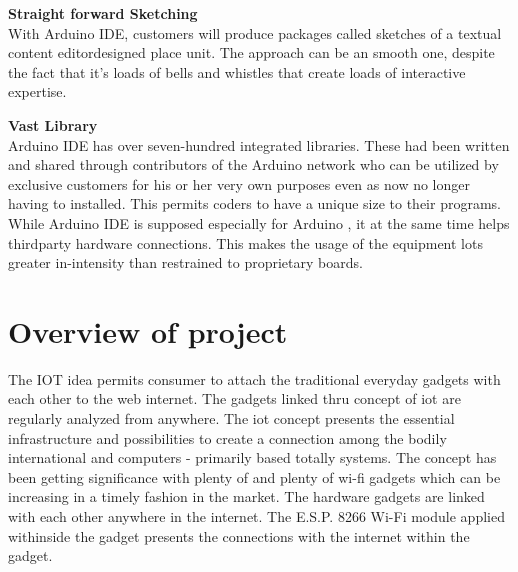 \documentclass[12pt,a4paper]{article}
\begin{document}
\vspace{0.1in}
\textbf{\large{Straight forward Sketching }}\\

\hspace{0.5cm}With Arduino IDE, customers will produce packages called sketches of a textual content editordesigned place unit. The approach can be an smooth one, despite the fact that it’s loads of bells and whistles
that create loads of interactive expertise.

\vspace{0.1in}
\textbf{\large{Vast Library }}\\

\hspace{0.5cm}Arduino IDE has over seven-hundred integrated libraries. These had been written and shared through
contributors of the Arduino network who can be utilized by exclusive customers for his or her very own purposes
even as now no longer having to installed. This permits coders to have a unique size to
their programs. While Arduino IDE is supposed especially for Arduino , it at the same time helps thirdparty hardware connections. This makes the usage of the equipment lots greater in-intensity than
restrained to proprietary boards.



\newpage
\pagebreak
\vspace*{\fill}%
\noindent
{}
\vfill


\newpage
\section{Overview of project}
\fancyfoot[R]{\thepage}

\hspace{0.5cm}The IOT idea permits consumer to attach the traditional everyday gadgets with each other to the web internet. The gadgets linked thru concept of iot are regularly analyzed from anywhere. The iot concept presents the essential infrastructure and possibilities to create a connection among the bodily international and computers - primarily based totally systems. The concept has been getting significance with plenty of and plenty of wi-fi gadgets which can be increasing in a timely fashion in the market. The hardware gadgets are linked with each other anywhere in the internet. The E.S.P. 8266 Wi-Fi module applied withinside the gadget presents the connections with the internet within the gadget.\\
\end{document}
